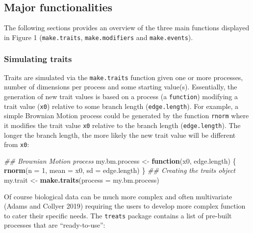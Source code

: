 \documentclass[
]{article}
\newenvironment{Shaded}{\begin{snugshade}}{\end{snugshade}}
\newcommand{\CommentTok}[1]{\textcolor[rgb]{0.56,0.35,0.01}{\textit{#1}}}
\newcommand{\ControlFlowTok}[1]{\textcolor[rgb]{0.13,0.29,0.53}{\textbf{#1}}}
\newcommand{\DataTypeTok}[1]{\textcolor[rgb]{0.13,0.29,0.53}{#1}}
\newcommand{\DecValTok}[1]{\textcolor[rgb]{0.00,0.00,0.81}{#1}}
\newcommand{\KeywordTok}[1]{\textcolor[rgb]{0.13,0.29,0.53}{\textbf{#1}}}
\newcommand{\NormalTok}[1]{#1}
\newcommand{\StringTok}[1]{\textcolor[rgb]{0.31,0.60,0.02}{#1}}
\begin{document}
\hypertarget{major-functionalities}{%
\subsection{Major functionalities}\label{major-functionalities}}

The following sections provides an overview of the three main functions
displayed in Figure 1 (\texttt{make.traits}, \texttt{make.modifiers} and
\texttt{make.events}).

\hypertarget{simulating-traits}{%
\subsubsection{Simulating traits}\label{simulating-traits}}

Traits are simulated via the \texttt{make.traits} function given one or
more processes, number of dimensions per process and some starting
value(s). Essentially, the generation of new trait values is based on a
process (a \texttt{function}) modifying a trait value (\texttt{x0})
relative to some branch length (\texttt{edge.length}). For example, a
simple Brownian Motion process could be generated by the function
\texttt{rnorm} where it modifies the trait value \texttt{x0} relative to
the branch length (\texttt{edge.length}). The longer the branch length,
the more likely the new trait value will be different from \texttt{x0}:

\begin{Shaded}
\begin{Highlighting}[]
\CommentTok{\#\# Brownian Motion process}
\NormalTok{my.bm.process \textless{}{-}}\StringTok{ }\ControlFlowTok{function}\NormalTok{(x0, edge.length) \{}
    \KeywordTok{rnorm}\NormalTok{(}\DataTypeTok{n =} \DecValTok{1}\NormalTok{, }\DataTypeTok{mean =}\NormalTok{ x0, }\DataTypeTok{sd =}\NormalTok{ edge.length)}
\NormalTok{\} }
\CommentTok{\#\# Creating the traits object}
\NormalTok{my.trait \textless{}{-}}\StringTok{ }\KeywordTok{make.traits}\NormalTok{(}\DataTypeTok{process =}\NormalTok{ my.bm.process)}
\end{Highlighting}
\end{Shaded}

Of course biological data can be much more complex and often
multivariate (Adams and Collyer 2019) requiring the users to develop
more complex function to cater their specific needs. The \texttt{treats}
package contains a list of pre-built processes that are
``ready-to-use'':
\end{document}

